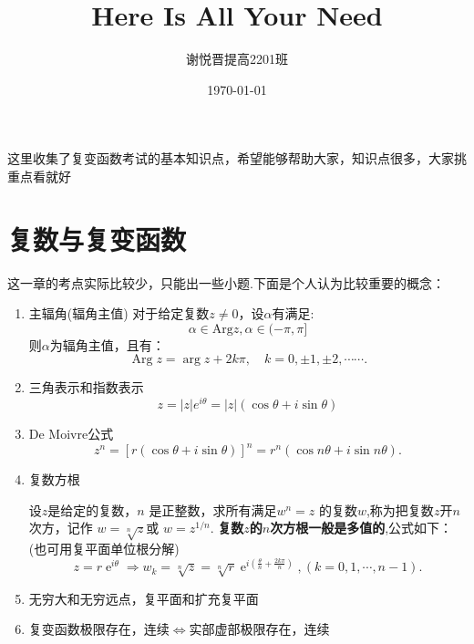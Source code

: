 \documentclass[a4paper,11pt,UTF8]{article}
\title{Here Is All Your Need}
\author{谢悦晋\quad 提高2201班}
\date{\today}
\begin{document}
\maketitle
这里收集了复变函数考试的基本知识点，希望能够帮助大家，知识点很多，大家挑重点看就好
\tableofcontents\newpage
\section{复数与复变函数}
这一章的考点实际比较少，只能出一些小题.下面是个人认为比较重要的概念：
\begin{enumerate}
	\item 主辐角(辐角主值)
	对于给定复数$z\neq0$，设$\alpha$有满足:
	$$\alpha\in\mathrm{Arg}z,\alpha\in(-\pi,\pi]$$
	则$\alpha$为辐角主值，且有：
	$$\operatorname{Arg}z=\operatorname{arg}z+2k\pi,\quad k=0,\pm1,\pm2,\cdots\cdots.$$
	\item 三角表示和指数表示
	$$z=|z|e^{i\theta}=|z|(\cos\theta+i\sin\theta)$$
	\item De Moivre公式
	$$z^n=[r(\cos\theta+i\sin\theta)]^n=r^n(\cos n\theta+i\sin n\theta).$$
	\item 复数方根
	
	设$z$是给定的复数，$n$ 是正整数，求所有满足$w^n=z$ 的复数$w$,称为把复数$z$开$n$ 次方，记作 $w=\sqrt[n]{z}$或 $w=z^{1/n}.$ \textbf{复数$z$的$n$次方根一般是多值的},公式如下：(也可用复平面单位根分解)
	$$z=r\operatorname{e}^{i\theta}\Rightarrow w_k=\sqrt[n]{z}=\sqrt[n]{r}\operatorname{e}^{i(\frac\theta n+\frac{2k\pi}n)},(k=0,1,\cdots,n-1).$$
	\item 无穷大和无穷远点，复平面和扩充复平面
	\item 复变函数极限存在，连续$\Leftrightarrow$实部虚部极限存在，连续
\end{enumerate}
\end{document}
